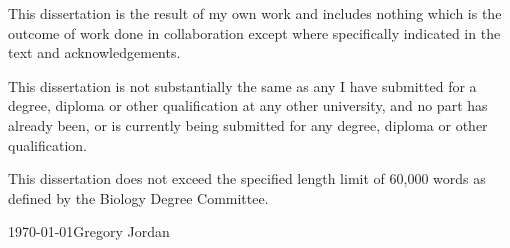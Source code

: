 \setlength{\parskip}{\baselineskip}

\noindent This dissertation is the result of my own work and includes nothing
which is the outcome of work done in collaboration except where
specifically indicated in the text and acknowledgements.

\noindent This dissertation is not substantially the same as any I have
submitted for a degree, diploma or other qualification at any other
university, and no part has already been, or is currently being
submitted for any degree, diploma or other qualification.


\noindent This dissertation does not exceed the specified length limit
of 60,000 words as defined by the Biology Degree Committee.

\noindent \today \hfill Gregory Jordan

\setlength{\parskip}{0pt}
